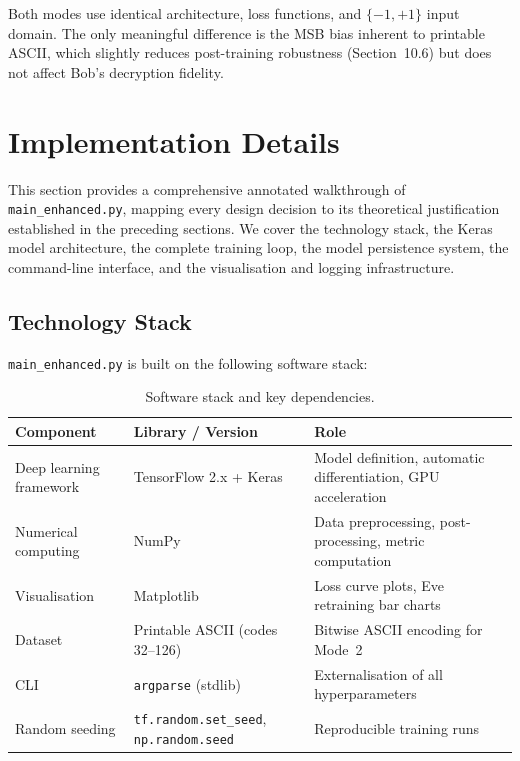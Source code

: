 \documentclass[12pt, a4paper]{article}
\newcommand{\code}[1]{\texttt{\color{CodeRed}#1}}
\begin{document}
Both modes use identical architecture, loss functions, and $\{-1,+1\}$
input domain. The only meaningful difference is the MSB bias inherent
to printable ASCII, which slightly reduces post-training robustness
(Section~10.6) but does not affect Bob's decryption fidelity.
\newpage
\section{Implementation Details}
\label{sec:implementation}

This section provides a comprehensive annotated walkthrough of
\code{main\_enhanced.py}, mapping every design decision to its theoretical
justification established in the preceding sections. We cover the
technology stack, the Keras model architecture, the complete training loop,
the model persistence system, the command-line interface, and the
visualisation and logging infrastructure.

\subsection{Technology Stack}
\label{subsec:tech_stack}

\code{main\_enhanced.py} is built on the following software stack:

\begin{table}[H]
  \centering
  \caption{Software stack and key dependencies.}
  \label{tab:tech_stack}
  \renewcommand{\arraystretch}{1.35}
  \begin{tabularx}{\linewidth}{@{} l l X @{}}
    \toprule
    \textbf{Component} & \textbf{Library / Version} & \textbf{Role} \\
    \midrule
    Deep learning framework & TensorFlow 2.x + Keras &
      Model definition, automatic differentiation, GPU acceleration \\[3pt]
    Numerical computing & NumPy &
      Data preprocessing, post-processing, metric computation \\[3pt]
    Visualisation & Matplotlib &
      Loss curve plots, Eve retraining bar charts \\[3pt]
    Dataset & Printable ASCII (codes 32--126) &
      Bitwise ASCII encoding for Mode~2 \\[3pt]
    CLI & \code{argparse} (stdlib) &
      Externalisation of all hyperparameters \\[3pt]
    Random seeding & \code{tf.random.set\_seed},
      \code{np.random.seed} &
      Reproducible training runs \\
    \bottomrule
  \end{tabularx}
\end{table}
\end{document}
